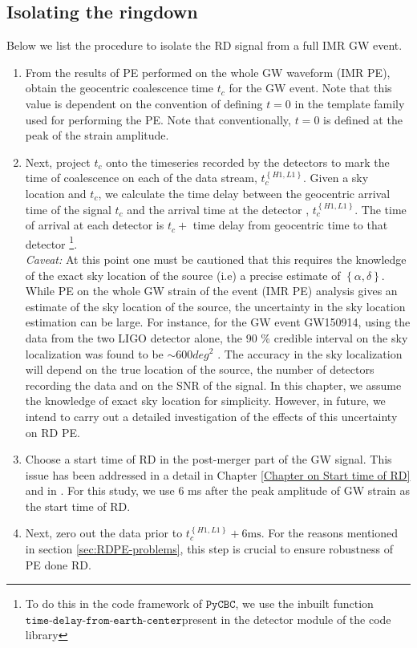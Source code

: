 \subsection{Isolating the ringdown}
\label{sec:isolate-rd}
Below we list the procedure to isolate the RD signal from a full IMR GW event. 
\begin{enumerate}
\item From the results of PE performed on the whole GW waveform (IMR PE), obtain the geocentric coalescence time $t_c$ for the GW event. Note that this value is dependent on the convention of defining $t=0$ in the template family used for performing the PE. Note that conventionally, $t=0$ is defined at the peak of the strain amplitude.
\item Next, project $t_{c}$ onto the timeseries recorded by the detectors to mark the time of coalescence on each of the data stream, $t_{c}^{\left\lbrace H1,L1 \right\rbrace}$. Given a sky location and $t_{c}$, we calculate the time delay between the geocentric arrival time of the signal $t_{c}$ and the arrival time at the detector , $t_{c}^{\left\lbrace H1,L1 \right\rbrace}$. The time of arrival at each detector is  $t_{c} +$ time delay from geocentric time to that detector \footnote{To do this in the code framework of $\texttt{PyCBC}$, we use the inbuilt function $\texttt{time-delay-from-earth-center}$present in the detector module of the code library}.  
\\ \textit{Caveat:} At this point one must be cautioned that this requires the knowledge of the exact sky location of the source (i.e) a precise estimate of $\left\lbrace \alpha, \delta \right\rbrace$. While PE on the whole GW strain of the event (IMR PE) analysis gives an estimate of the sky location of the source, the uncertainty in the sky location estimation can be large. For instance, for the GW event GW150914, using the data from the two LIGO detector alone, the 90 \% credible interval on the sky localization was found to be $\sim 600 deg^{2}$ \cite{skyloc:GW150914}. The accuracy in the sky localization will depend on the true location of the source, the number of detectors recording the data and on the SNR of the signal. In this chapter, we assume the knowledge of exact sky location for simplicity. However, in future, we intend to carry out a detailed investigation of the effects of this uncertainty on RD PE.   
\item Choose a start time of RD in the post-merger part of the GW signal. This issue has been addressed in a detail in Chapter \ref{Chapter on Start time of RD} and in \cite{EMOP,Baibhav:2017jhs,London,2012PhRvL.109n1102K}. For this study, we use 6 ms after the peak amplitude of GW strain as the start time of RD. 
\item Next, zero out the data prior to $t_{c}^{\left\lbrace H1,L1 \right\rbrace} + 6 \mathrm{ms}$. For the reasons mentioned in section \ref{sec:RDPE-problems}, this step is crucial to ensure robustness of PE done RD.  
\end{enumerate}

